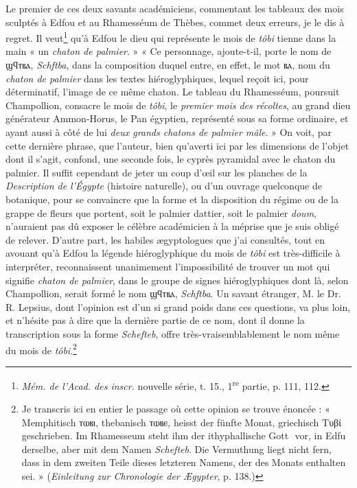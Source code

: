 \documentclass{article}
\newcommand*\hieroAAAU{}
\begin{document}
Le premier de ces deux savants académiciens, commentant les tableaux des mois sculptés à Edfou et au Rhamesséum de Thèbes, commet deux erreurs, je le dis à regret. Il veut\footnote{\emph{Mém. de l'Acad. des inscr.} nouvelle série, t. 15., 1\textsuperscript{re} partie, p. 111, 112.} qu'à Edfou le dieu qui représente le mois de \emph{tôbi} tienne dans la main « un \emph{chaton de palmier}. » « Ce personnage, ajoute-t-il, porte le nom de \textcoptic{ϣϥⲧⲃⲁ}, \emph{Schftba}, dans la composition duquel entre, en effet, le mot \textcoptic{ⲃⲁ}, nom du \emph{chaton de palmier} dans les textes hiéroglyphiques, lequel reçoit ici, pour déterminatif, l'image de ce même chaton. Le tableau du Rhamesséum, poursuit Champollion, consacre le mois de \emph{tôbi}, le \emph{premier mois des récoltes}, au grand dieu générateur Ammon-Horus, le Pan égyptien, représenté sous sa forme ordinaire, et ayant aussi à côté de lui \emph{deux grands chatons de palmier mâle}. » On voit, par cette dernière phrase, que l'auteur, bien qu'averti ici par les dimensions de l'objet dont il s'agit, confond, une seconde fois, le cyprès pyramidal avec le chaton du palmier. Il suffit cependant de jeter un coup d'œil sur les planches de la \emph{Description de l'Égypte} (histoire naturelle), ou d'un ouvrage quelconque de botanique, pour se convaincre que la forme et la disposition du régime ou de la grappe de fleurs que portent, soit le palmier dattier, soit le palmier \emph{doum}, n'auraient pas dû exposer le célèbre académicien à la méprise que je suis obligé de relever. D'autre part, les habiles ægyptologues que j'ai consultés, tout en avouant qu'à Edfou la légende hiéroglyphique du mois de \emph{tôbi} est très-difficile à interpréter, reconnaissent unanimement l'impossibilité de trouver un mot qui signifie \emph{chaton de palmier}, dans le groupe de signes hiéroglyphiques dont là, selon Champollion, serait formé le nom \textcoptic{ϣϥⲧⲃⲁ}, \emph{Schftba}. Un savant étranger, M. le Dr. R. Lepsius, dont l'opinion est d'un si grand poids dans ces questions, va plus loin, et n'hésite pas à dire que la dernière partie de ce nom, dont il donne la transcription sous la forme \emph{Schefteb}, offre très-vraisemblablement le nom même du mois de \emph{tôbi}.\footnote{Je transcris ici en entier le passage où cette opinion se trouve énoncée : « Memphitisch \textcoptic{ⲧⲱⲃⲓ}, thebanisch \textcoptic{ⲧⲱⲃⲉ}, heisst der fünfte Monat, griechisch \textgreek{Τυβί} geschrieben. Im Rhamesseum steht ihm der ithyphallische Gott $\hieroAAAU$ vor, in Edfu derselbe, aber mit dem Namen \emph{Schefteb}. Die Vermuthung liegt nicht fern, dass in dem zweiten Teile dieses letzteren Namens, der des Monats enthalten sei. » (\emph{Einleitung zur Chronologie der Ægypter}, p. 138.)}
\end{document}

